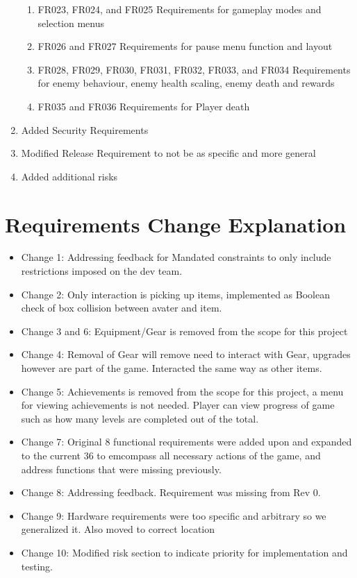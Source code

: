 \documentclass[]{article}
\begin{document}
\begin{enumerate}
\begin{enumerate}
		\item FR023, FR024, and FR025 Requirements for gameplay modes and selection menus
		\item FR026 and FR027 Requirements for pause menu function and layout
		\item FR028, FR029, FR030, FR031, FR032, FR033, and FR034 Requirements for enemy behaviour, enemy health scaling, enemy death and rewards
		\item FR035 and FR036 Requirements for Player death
	\end{enumerate}
	\item Added Security Requirements
	\item Modified Release Requirement to not be as specific and more general
	\item Added additional risks
\end{enumerate}

\section*{Requirements Change Explanation}
\begin{itemize}
	\item Change 1: Addressing feedback for Mandated constraints to only include restrictions imposed on the dev team.
	\item Change 2: Only interaction is picking up items, implemented as Boolean check of box collision between avater and item.
	\item Change 3 and 6: Equipment/Gear is removed from the scope for this project
	\item Change 4: Removal of Gear will remove need to interact with Gear, upgrades however are part of the game. Interacted the same way as other items.
	\item Change 5: Achievements is removed from the scope for this project, a menu for viewing achievements is not needed. Player can view progress of game such as how many levels are completed out of the total.
	\item Change 7: Original 8 functional requirements were added upon and expanded to the current 36 to emcompass all necessary actions of the game, and address functions that were missing previously.
	\item Change 8: Addressing feedback. Requirement was missing from Rev 0.
	\item Change 9: Hardware requirements were too specific and arbitrary so we generalized it. Also moved to correct location
	\item Change 10: Modified risk section to indicate priority for implementation and testing.
\end{itemize}
\end{document}
